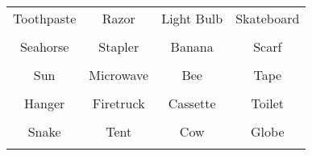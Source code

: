 \documentclass[12pt,a4paper]{article}
\begin{document}
\thispagestyle{empty}
\begin{table}[]
\centering
\Huge
\begin{tabular}{cccc}
 Toothpaste& Razor& Light Bulb& Skateboard\\  & & & \\
 Seahorse& Stapler& Banana& Scarf\\  & & & \\
 Sun& Microwave& Bee& Tape\\  & & & \\
 Hanger& Firetruck& Cassette& Toilet\\  & & & \\
 Snake& Tent& Cow& Globe\\  & & & \\
\end{tabular}
\end{table}
\end{document}
